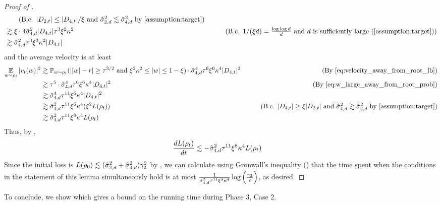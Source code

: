 \begin{proof}[Proof of ]
\begin{align}
& \tag{B.c. $|D_{2, t}| \leq |D_{4, t}|/\xi$ and $\sigmaCoeffTwo^2 \lesssim \sigmaCoeffFour^2$ by \Cref{assumption:target}} \\
& \gtrsim \xi \cdot 4 \sigmaCoeffFour^2 |D_{4, t}| \tau^3 \xi^2 \kappa^2
& \tag{B.c. $1/(\xi d) = \frac{\log \log d}{d}$ and $d$ is sufficiently large (\Cref{assumption:target})} \\
& \gtrsim \sigmaCoeffFour^2 \tau^3 \xi^3 \kappa^2 |D_{4, t}|
& \label{eq:velocity_away_from_root_lb}
\end{align}
and the average velocity is at least
\begin{align}
\E_{\w \sim \rho_t} |\vel_t(\w)|^2
& \gtrsim \Prob_{\w \sim \rho_t}(||\w| - r| \geq \tau^{3/2} \text{ and }\xi^2 \kappa^2 \leq |\w| \leq 1 - \xi)
\cdot \sigmaCoeffFour^4 \tau^6 \xi^6 \kappa^4 |D_{4, t}|^2
& \tag{By \Cref{eq:velocity_away_from_root_lb}} \\
& \gtrsim \tau^5 \cdot \sigmaCoeffFour^4 \tau^6 \xi^6 \kappa^4 |D_{4, t}|^2
& \tag{By \Cref{eq:w_large_away_from_root_prob}} \\
& \gtrsim \sigmaCoeffFour^4 \tau^{11} \xi^6 \kappa^4 |D_{4, t}|^2 \\
& \gtrsim \sigmaCoeffFour^2 \tau^{11} \xi^6 \kappa^4 (\xi^2 L(\rho_t))
& \tag{B.c. $|D_{4, t}| \geq \xi |D_{2, t}|$ and $\sigmaCoeffFour^2 \gtrsim \sigmaCoeffTwo^2$ by \Cref{assumption:target}} \\
& \gtrsim \sigmaCoeffFour^2 \tau^{11} \xi^8 \kappa^4 L(\rho_t)
\end{align}
Thus, by ,
\begin{align}
\frac{dL(\rho_t)}{dt}
& \lesssim -\hat{\sigma}_{4, d}^2 \tau^{11} \xi^8 \kappa^4 L(\rho_t)
\end{align}
Since the initial loss is $L(\rho_0) \lesssim (\hat{\sigma}_{2, d}^2 + \hat{\sigma}_{4, d}^2) \gamma_2^2$ by , we can calculate using Gronwall's inequality () that the time spent when the conditions in the statement of this lemma simultaneously hold is at most $\frac{1}{\hat{\sigma}_{4, d}^2 \tau^{11} \xi^8 \kappa^4} \log\Big(\frac{\gamma_2}{\epsilon}\Big)$, as desired.
\end{proof}

To conclude, we show  which gives a bound on the running time during Phase 3, Case 2.

